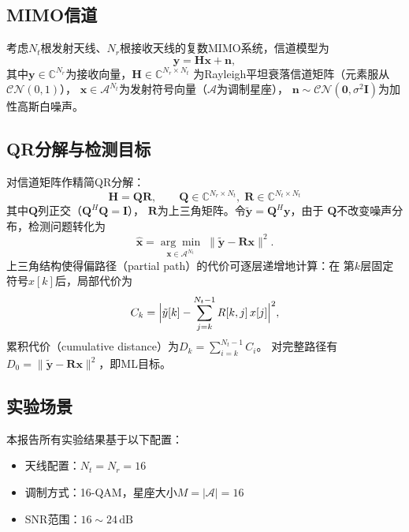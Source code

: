 \documentclass[12pt, a4paper]{ctexart}
\begin{document}
\subsection{MIMO信道}

考虑$N_t$根发射天线、$N_r$根接收天线的复数MIMO系统，信道模型为
\begin{equation}\label{eq:channel}
  \mathbf{y} = \mathbf{H}\mathbf{x} + \mathbf{n},
\end{equation}
其中$\mathbf{y}\in\mathbb{C}^{N_r}$为接收向量，$\mathbf{H}\in\mathbb{C}^{N_r\times N_t}$
为Rayleigh平坦衰落信道矩阵（元素服从$\mathcal{CN}(0,1)$），
$\mathbf{x}\in\mathcal{A}^{N_t}$为发射符号向量（$\mathcal{A}$为调制星座），
$\mathbf{n}\sim\mathcal{CN}(\mathbf{0},\sigma^2\mathbf{I})$为加性高斯白噪声。

\subsection{QR分解与检测目标}

对信道矩阵作精简QR分解：
\begin{equation}\label{eq:qr}
  \mathbf{H} = \mathbf{Q}\mathbf{R},
  \qquad
  \mathbf{Q}\in\mathbb{C}^{N_r\times N_t},\;
  \mathbf{R}\in\mathbb{C}^{N_t\times N_t}
\end{equation}
其中$\mathbf{Q}$列正交（$\mathbf{Q}^H\mathbf{Q}=\mathbf{I}$），
$\mathbf{R}$为上三角矩阵。令$\tilde{\mathbf{y}}=\mathbf{Q}^H\mathbf{y}$，由于
$\mathbf{Q}$不改变噪声分布，检测问题转化为
\begin{equation}\label{eq:detect}
  \hat{\mathbf{x}} = \underset{\mathbf{x}\in\mathcal{A}^{N_t}}{\arg\min}
  \;\|\tilde{\mathbf{y}} - \mathbf{R}\mathbf{x}\|^2.
\end{equation}
上三角结构使得偏路径（partial path）的代价可逐层递增地计算：在
第$k$层固定符号$x[k]$后，局部代价为
\begin{equation}\label{eq:localdist}
  C_k = \Bigl|\tilde{y}[k]
        - \sum_{j=k}^{N_t-1} R[k,j]\,x[j]\Bigr|^2,
\end{equation}
累积代价（cumulative distance）为$D_k = \sum_{i=k}^{N_t-1} C_i$。
对完整路径有$D_0 = \|\tilde{\mathbf{y}}-\mathbf{R}\mathbf{x}\|^2$，即ML目标。

\subsection{实验场景}

本报告所有实验结果基于以下配置：
\begin{itemize}[leftmargin=2em]
  \item 天线配置：$N_t = N_r = 16$
  \item 调制方式：16-QAM，星座大小$M=|\mathcal{A}|=16$
  \item SNR范围：$16\sim24\,\mathrm{dB}$
\end{itemize}
\end{document}
